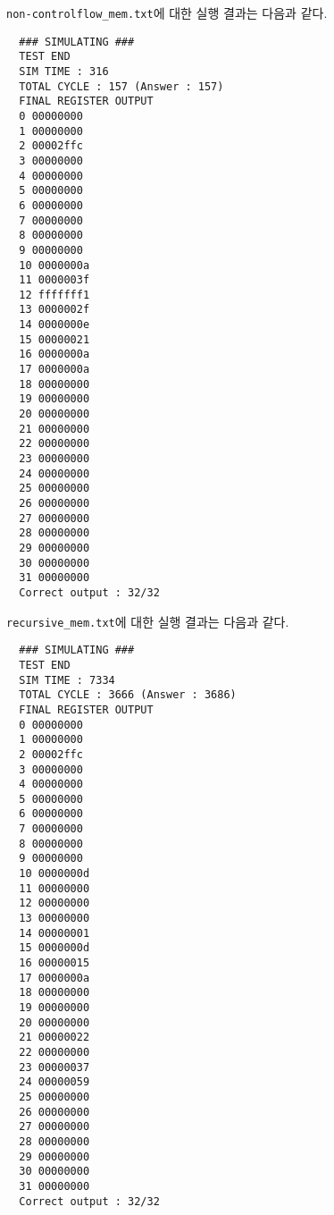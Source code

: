 \documentclass{scrartcl}
\begin{document}
\texttt{non-controlflow\_mem.txt}에 대한 실행 결과는 다음과 같다.

\begin{lstlisting}
  ### SIMULATING ###
  TEST END
  SIM TIME : 316
  TOTAL CYCLE : 157 (Answer : 157)
  FINAL REGISTER OUTPUT
  0 00000000
  1 00000000
  2 00002ffc
  3 00000000
  4 00000000
  5 00000000
  6 00000000
  7 00000000
  8 00000000
  9 00000000
  10 0000000a
  11 0000003f
  12 fffffff1
  13 0000002f
  14 0000000e
  15 00000021
  16 0000000a
  17 0000000a
  18 00000000
  19 00000000
  20 00000000
  21 00000000
  22 00000000
  23 00000000
  24 00000000
  25 00000000
  26 00000000
  27 00000000
  28 00000000
  29 00000000
  30 00000000
  31 00000000
  Correct output : 32/32
\end{lstlisting}

\texttt{recursive\_mem.txt}에 대한 실행 결과는 다음과 같다.

\begin{lstlisting}
  ### SIMULATING ###
  TEST END
  SIM TIME : 7334
  TOTAL CYCLE : 3666 (Answer : 3686)
  FINAL REGISTER OUTPUT
  0 00000000
  1 00000000
  2 00002ffc
  3 00000000
  4 00000000
  5 00000000
  6 00000000
  7 00000000
  8 00000000
  9 00000000
  10 0000000d
  11 00000000
  12 00000000
  13 00000000
  14 00000001
  15 0000000d
  16 00000015
  17 0000000a
  18 00000000
  19 00000000
  20 00000000
  21 00000022
  22 00000000
  23 00000037
  24 00000059
  25 00000000
  26 00000000
  27 00000000
  28 00000000
  29 00000000
  30 00000000
  31 00000000
  Correct output : 32/32
\end{lstlisting}
\end{document}
